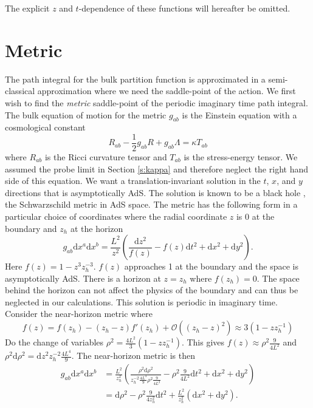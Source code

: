 \documentclass[12pt]{report}
\renewcommand{\d}{\ensuremath{\mathrm{d}}}
\begin{document}
The explicit $z$ and $t$-dependence of these functions will hereafter be omitted. 
\section{Metric\label{s:metric}}
The path integral for the bulk partition function is approximated in a semi-classical approximation where we need the saddle-point of the action. We first wish to find the \emph{metric} saddle-point of the periodic imaginary time path integral. The bulk equation of motion for the metric $g_{ab}$ is the Einstein equation with a cosmological constant
\begin{equation}
R_{ab}-\frac{1}{2}g_{ab}R+g_{ab}\Lambda=\kappa T_{ab}\label{einstein}
\end{equation}
where $R_{ab}$ is the Ricci curvature tensor and $T_{ab}$ is the stress-energy tensor. We assumed the probe limit in Section \ref{s:kappa} and therefore neglect the right hand side of this equation. We want a translation-invariant solution in the $t$, $x$, and $y$ directions that is asymptotically AdS. The solution is known to be a black hole \cite{McGreevy:2009xe}, the Schwarzschild metric in AdS space. The metric has the following form in a particular choice of coordinates where the radial coordinate $z$ is 0 at the boundary and $z_h$ at the horizon
\begin{equation}
 g_{ab}\d x^a\d x^b=\frac{L^2}{z^2}\left(\frac{\d z^2}{f(z)}-f(z)\d t^2+\d x^2+\d y^2\right).\label{metric}
\end{equation}
Here $f(z)=1-z^3z_h^{-3}$. $f(z)$ approaches 1 at the boundary and the space is asymptotically AdS. There is a horizon at $z=z_h$ where $f(z_h)=0$. The space behind the horizon can not affect the physics of the boundary and can thus be neglected in our calculations. This solution is periodic in imaginary time. Consider the near-horizon metric where
\begin{equation}
  f(z)=f(z_h)-(z_h-z)f'(z_h)+\mathcal{O}((z_h-z)^2)\approx 3(1-zz_h^{-1})
\end{equation}
Do the change of variables $\rho^2=\frac{4L^2}{3}(1-zz_h^{-1})$. This gives $f(z)\approx \rho^2\frac{9}{4L^2}$ and $\rho^2\d \rho^2=\d z^2 z_h^{-2}\frac{4L^4}{9}$. The near-horizon metric is then
\begin{equation}
\begin{split}
 g_{ab}\d x^a\d x^b&=\frac{L^2}{z_h^2}\left(\frac{\rho^2\d \rho^2  }{z_h^{-2}\frac{4L^4}{9}\rho^2\frac{9}{4L^2}}-\rho^2\frac{9}{4L^2}\d t^2+\d x^2+\d y^2\right)\\
&= \d \rho^2 -\rho^2\frac{9}{4z_h^2}\d t^2+\frac{L^2}{z_h^2}\left(\d x^2+\d y^2\right).
\end{split}
\end{equation}
\end{document}
